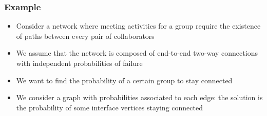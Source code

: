 \documentclass{beamer}
\begin{document}

\begin{frame}
\frametitle{Example}
\begin{itemize}
	\item Consider a network where meeting activities for a group require the existence of paths
	between every pair of collaborators
\medskip
	\item We assume that the network is composed of end-to-end two-way connections with
	independent probabilities of failure
\medskip
	\item We want to find the probability of a certain group to stay connected
\medskip
	\item We consider a graph with probabilities associated to each edge: the solution is the
	probability of some interface vertices staying connected
\end{itemize}
\end{frame}
\end{document}
